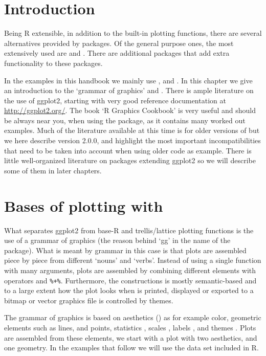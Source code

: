\documentclass[paper=a4,10pt,div=17,headsepline,BCOR=12mm,twoside,open=right]{scrbook}\usepackage{knitr}
\begin{document}
\section{Introduction}

Being R extensible, in addition to the built-in plotting functions, there are several alternatives provided by packages. Of the general purpose ones, the most extensively used are  and \ggplot. There are additional packages that add extra functionality to these packages.

In the examples in this handbook we mainly use \ggplot, \ggmap and \ggtern. In this chapter we give an introduction to the `grammar of graphics' and \ggplot. There is ample literature on the use of ggplot2, starting with very good reference documentation at \url{http://ggplot2.org/}. The book `R Graphics Cookbook' \cite{Chang2013} is very useful and should be always near you, when using the package, as it contains many worked out examples. Much of the literature available at this time is for older versions of \ggplot but we here describe version 2.0.0, and highlight the most important incompatibilities that need to be taken into account when using older code as example. There is little well-organized literature on packages extending ggplot2 so we will describe some of them in later chapters.

\section{Bases of plotting with \ggplot}

What separates ggplot2 from base-R and trellis/lattice plotting functions is the use of a grammar of graphics (the reason behind `gg' in the name of the package). What is meant by grammar in this case is that plots are assembled piece by piece from different `nouns' and `verbs'. Instead of using a single function with many arguments, plots are assembled by combining different elements with operators \code{+} and \verb|%+%|. Furthermore, the constructions is mostly semantic-based and to a large extent how the plot looks when is printed, displayed or exported to a bitmap or vector graphics file is controlled by themes.

The grammar of graphics is based on aesthetics () as for example color, geometric elements  such as lines, and points, statistics , scales , labels , and themes . Plots are assembled from these elements, we start with a plot with two aesthetics, and one geometry. In the examples that follow we will use the  data set included in R.
\end{document}
